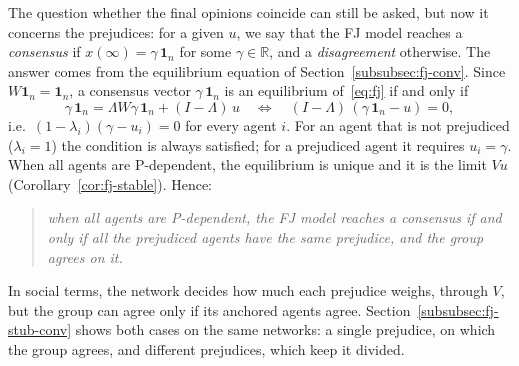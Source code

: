 The question whether the final opinions coincide can still be asked, but now it
concerns the prejudices: for a given $u$, we say that the FJ model reaches a
\emph{consensus} if $x(\infty) = \gamma\,\mathbf{1}_n$ for some $\gamma \in \mathbb{R}$, and a
\emph{disagreement} otherwise. The answer comes from the equilibrium equation of
Section~\ref{subsubsec:fj-conv}. Since $W \mathbf{1}_n = \mathbf{1}_n$, a consensus
vector $\gamma\,\mathbf{1}_n$ is an equilibrium of~\eqref{eq:fj} if and only if
\[
  \gamma\,\mathbf{1}_n = \Lambda W \gamma\,\mathbf{1}_n + (I - \Lambda)\, u
  \quad\iff\quad
  (I - \Lambda)\,(\gamma\,\mathbf{1}_n - u) = 0 ,
\]
i.e.\ $(1 - \lambda_i)(\gamma - u_i) = 0$ for every agent $i$. For an agent that is not
prejudiced ($\lambda_i = 1$) the condition is always satisfied; for a prejudiced agent it
requires $u_i = \gamma$.
 When all agents are P-dependent, the equilibrium is unique and it is
the limit $Vu$ (Corollary~\ref{cor:fj-stable}). Hence:
\begin{quote}
  \itshape when all agents are P-dependent, the FJ model reaches a consensus if and only
  if all the prejudiced agents have the same prejudice, and the group agrees on it.
\end{quote}
In social terms, the network decides how much each prejudice weighs, through $V$, but the
group can agree only if its anchored agents agree. Section~\ref{subsubsec:fj-stub-conv}
shows both cases on the same networks: a single prejudice, on which the group agrees,
and different prejudices, which keep it divided.

